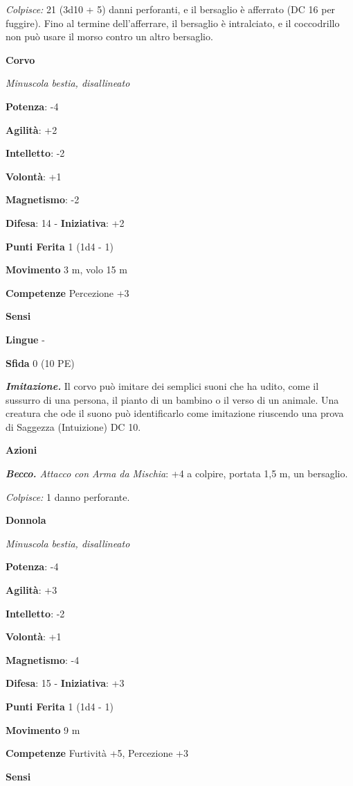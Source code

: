 \begin{multicols}{2}
\emph{Colpisce:} 21 (3d10 + 5) danni perforanti, e il bersaglio è
afferrato (DC 16 per fuggire). Fino al termine dell'afferrare, il
bersaglio è intralciato, e il coccodrillo non può usare il morso contro
un altro bersaglio.

\textbf{Corvo}

\emph{Minuscola bestia, disallineato}

\textbf{Potenza}: -4

\textbf{Agilità}: +2

\textbf{Intelletto}: -2

\textbf{Volontà}: +1

\textbf{Magnetismo}: -2

\textbf{Difesa}: 14 - \textbf{Iniziativa}: +2

\textbf{Punti Ferita} 1 (1d4 - 1)

\textbf{Movimento} 3 m, volo 15 m

\textbf{Competenze} Percezione +3

\textbf{Sensi} 

\textbf{Lingue} -

\textbf{Sfida} 0 (10 PE)

\emph{\textbf{Imitazione.}} Il corvo può imitare dei semplici suoni che
ha udito, come il sussurro di una persona, il pianto di un bambino o il
verso di un animale. Una creatura che ode il suono può identificarlo
come imitazione riuscendo una prova di Saggezza (Intuizione) DC 10.

\textbf{Azioni}

\emph{\textbf{Becco.} Attacco con Arma da Mischia}: +4 a colpire,
portata 1,5 m, un bersaglio.

\emph{Colpisce:} 1 danno perforante.

\textbf{Donnola}

\emph{Minuscola bestia, disallineato}

\textbf{Potenza}: -4

\textbf{Agilità}: +3

\textbf{Intelletto}: -2

\textbf{Volontà}: +1

\textbf{Magnetismo}: -4

\textbf{Difesa}: 15 - \textbf{Iniziativa}: +3

\textbf{Punti Ferita} 1 (1d4 - 1)

\textbf{Movimento} 9 m

\textbf{Competenze} Furtività +5, Percezione +3

\textbf{Sensi} 


\end{multicols}
